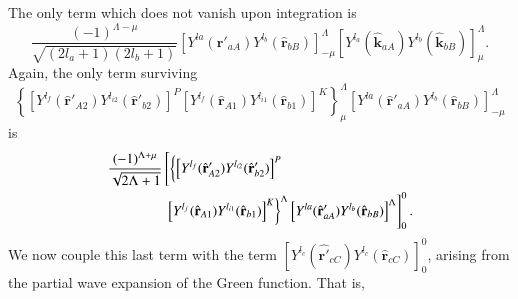 The only term which does not vanish upon integration is
\begin{equation}\label{eq218}
\frac{(-1)^{\Lambda-\mu}}{\sqrt{(2l_a+1)(2l_b+1)}} \left[Y^{la} (\hat{\mathbf{r}}'_{aA}) Y^{l_{b}} (\hat{\mathbf{r}}_{bB}) \right]^{\Lambda}_{-\mu}\left[ Y ^{l_a} (\hat{\mathbf{k}}_{aA}) Y ^{l_{b}} (\hat{\mathbf{k}}_{bB}) \right]^{\Lambda}_\mu.
\end{equation}
Again, the only term surviving
\begin{equation}\label{eq219}
\left\lbrace \left[Y^{l_f} (\hat{\mathbf{r}}'_{A2}) Y^{l_{i2}} (\hat{\mathbf{r}}'_{b2}) \right]^{P}
\left[ Y ^{l_f} (\hat{\mathbf{r}}_{A1}) Y ^{l_{i1}} (\hat{\mathbf{r}}_{b1}) \right]^{K} \right\rbrace ^\Lambda_\mu\left[Y^{la} (\hat{\mathbf{r}}'_{aA}) Y^{l_{b}} (\hat{\mathbf{r}}_{bB}) \right]^{\Lambda}_{-\mu}
\end{equation}
is
\begin{equation}\label{eq220}
\begin{split}
\frac{(-1)^{\Lambda+\mu}}{\sqrt{2  \Lambda+1}}&
 \left [\left\lbrace \left[Y^{l_f} (\hat{\mathbf{r}}'_{A2})
  Y^{l_{i2}} (\hat{\mathbf{r}}'_{b2}) \right]^{P} \right. \vphantom{\left.\left[ Y ^{l_{i1}}\right]^{K} \right\rbrace ^\Lambda} \right.\\
& \left. \left. \left[ Y ^{l_f} (\hat{\mathbf{r}}_{A1}) Y ^{l_{i1}} (\hat{\mathbf{r}}_{b1}) \right]^{K} \right\rbrace ^\Lambda\left[Y^{la} (\hat{\mathbf{r}}'_{aA}) Y^{l_{b}} (\hat{\mathbf{r}}_{bB}) \right]^{\Lambda}\right ]_0^0.
\end{split}
\end{equation}
We now couple this last term with the term $\left[ Y ^{l_c} (\hat{\mathbf{r}'}_{cC}) Y ^{l_{c}} (\hat{\mathbf{r}}_{cC}) \right]^{0}_0$, arising from the partial wave expansion of the Green function. That is,
